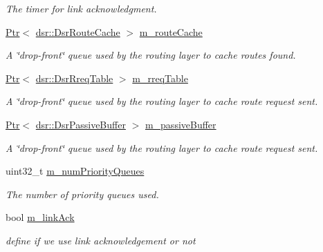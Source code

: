 \begin{DoxyCompactItemize}
\begin{DoxyCompactList}\small\item\em The timer for link acknowledgment. \end{DoxyCompactList}\item 
\hyperlink{classns3_1_1Ptr}{Ptr}$<$ \hyperlink{classns3_1_1dsr_1_1DsrRouteCache}{dsr\+::\+Dsr\+Route\+Cache} $>$ \hyperlink{classns3_1_1dsr_1_1DsrRouting_ac409bdb961b9fff0fb63ebd026be99ad}{m\+\_\+route\+Cache}
\begin{DoxyCompactList}\small\item\em A \char`\"{}drop-\/front\char`\"{} queue used by the routing layer to cache routes found. \end{DoxyCompactList}\item 
\hyperlink{classns3_1_1Ptr}{Ptr}$<$ \hyperlink{classns3_1_1dsr_1_1DsrRreqTable}{dsr\+::\+Dsr\+Rreq\+Table} $>$ \hyperlink{classns3_1_1dsr_1_1DsrRouting_ae9ec27743735fa2d59cc5190961d1942}{m\+\_\+rreq\+Table}
\begin{DoxyCompactList}\small\item\em A \char`\"{}drop-\/front\char`\"{} queue used by the routing layer to cache route request sent. \end{DoxyCompactList}\item 
\hyperlink{classns3_1_1Ptr}{Ptr}$<$ \hyperlink{classns3_1_1dsr_1_1DsrPassiveBuffer}{dsr\+::\+Dsr\+Passive\+Buffer} $>$ \hyperlink{classns3_1_1dsr_1_1DsrRouting_ac0404985fc04df7f5b8f53ff1e487079}{m\+\_\+passive\+Buffer}
\begin{DoxyCompactList}\small\item\em A \char`\"{}drop-\/front\char`\"{} queue used by the routing layer to cache route request sent. \end{DoxyCompactList}\item 
uint32\+\_\+t \hyperlink{classns3_1_1dsr_1_1DsrRouting_aa1952258d04f2ca8a0980d8436bca317}{m\+\_\+num\+Priority\+Queues}
\begin{DoxyCompactList}\small\item\em The number of priority queues used. \end{DoxyCompactList}\item 
bool \hyperlink{classns3_1_1dsr_1_1DsrRouting_a216a52d8b579a034df948765d941d3a4}{m\+\_\+link\+Ack}
\begin{DoxyCompactList}\small\item\em define if we use link acknowledgement or not \end{DoxyCompactList}\item 

\end{DoxyCompactItemize}
